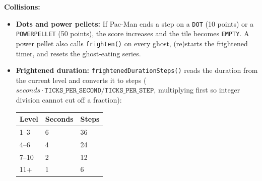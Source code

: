 \documentclass[11pt, a4paper]{article}
\begin{document}
\textbf{Collisions:}
\begin{itemize}
    \item \textbf{Dots and power pellets:} If Pac-Man ends a step on a \texttt{DOT} (10 points) or a \texttt{POWERPELLET} (50 points), the score increases and the tile becomes \texttt{EMPTY}. A power pellet also calls \texttt{frighten()} on every ghost, (re)starts the frightened timer, and resets the ghost-eating series.
    \item \textbf{Frightened duration:} \texttt{frightenedDurationSteps()} reads the duration from the current level and converts it to steps ($\textit{seconds} \cdot \texttt{TICKS\_PER\_SECOND} / \texttt{TICKS\_PER\_STEP}$, multiplying first so integer division cannot cut off a fraction):

    \vspace{0.1cm}
    \begin{tabular}{@{}lll@{}}
        \toprule
        \textbf{Level} & \textbf{Seconds} & \textbf{Steps} \\
        \midrule
        1--3 & 6 & 36 \\
        4--6 & 4 & 24 \\
        7--10 & 2 & 12 \\
        11+ & 1 & 6 \\
        \bottomrule
    \end{tabular}
    \vspace{0.1cm}


\end{itemize}
\end{document}
